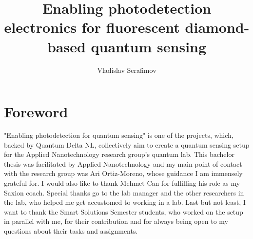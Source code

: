 \documentclass{report}
\title{Enabling photodetection electronics for 
	fluorescent diamond-based quantum sensing}
\author{Vladislav Serafimov}
\begin{document}
	\maketitle
	
	
	
	\tableofcontents
	\chapter{Foreword}
	"Enabling photodetection for quantum sensing" is one of the projects, which, backed by Quantum Delta NL, collectively aim to create a quantum sensing setup for the Applied Nanotechnology research group's quantum lab. This bachelor thesis was facilitated by Applied Nanotechnology and my main point of contact with the research group was Ari Ortiz-Moreno, whose guidance I am immensely grateful for. I would also like to thank Mehmet Can for fulfilling his role as my Saxion coach. Special thanks go to the lab manager and the other researchers in the lab, who helped me get accustomed to working in a lab. Last but not least, I want to thank the Smart Solutions Semester students, who worked on the setup in parallel with me, for their contribution and for always being open to my questions about their tasks and assignments.
	
	
\end{document}
